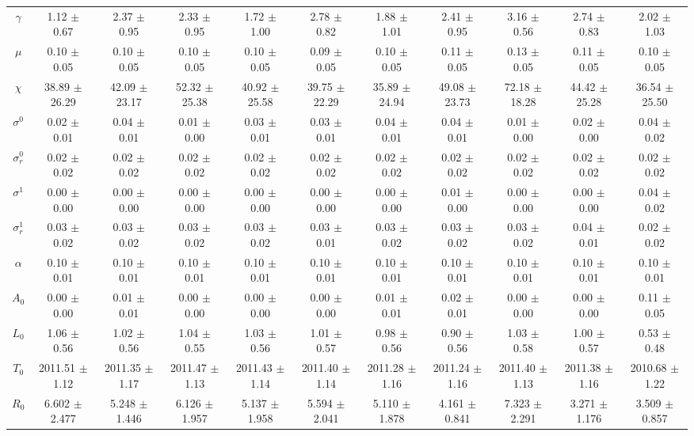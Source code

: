\begin{sidewaystable}
\begin{tabular}{ccccccccccc}
{\bf $\gamma$} & 1.12 $\pm$ 0.67 & 2.37 $\pm$ 0.95 & 2.33 $\pm$ 0.95 & 1.72 $\pm$ 1.00 & 2.78 $\pm$ 0.82 & 1.88 $\pm$ 1.01 & 2.41 $\pm$ 0.95 & 3.16 $\pm$ 0.56 & 2.74 $\pm$ 0.83 & 2.02 $\pm$ 1.03 \\
{\bf $\mu$} & 0.10 $\pm$ 0.05 & 0.10 $\pm$ 0.05 & 0.10 $\pm$ 0.05 & 0.10 $\pm$ 0.05 & 0.09 $\pm$ 0.05 & 0.10 $\pm$ 0.05 & 0.11 $\pm$ 0.05 & 0.13 $\pm$ 0.05 & 0.11 $\pm$ 0.05 & 0.10 $\pm$ 0.05 \\
{\bf $\chi$} & 38.89 $\pm$ 26.29 & 42.09 $\pm$ 23.17 & 52.32 $\pm$ 25.38 & 40.92 $\pm$ 25.58 & 39.75 $\pm$ 22.29 & 35.89 $\pm$ 24.94 & 49.08 $\pm$ 23.73 & 72.18 $\pm$ 18.28 & 44.42 $\pm$ 25.28 & 36.54 $\pm$ 25.50 \\
{\bf $\sigma^0$} & 0.02 $\pm$ 0.01 & 0.04 $\pm$ 0.01 & 0.01 $\pm$ 0.00 & 0.03 $\pm$ 0.01 & 0.03 $\pm$ 0.01 & 0.04 $\pm$ 0.01 & 0.04 $\pm$ 0.01 & 0.01 $\pm$ 0.00 & 0.02 $\pm$ 0.00 & 0.04 $\pm$ 0.02 \\
{\bf $\sigma^0_r$} & 0.02 $\pm$ 0.02 & 0.02 $\pm$ 0.02 & 0.02 $\pm$ 0.02 & 0.02 $\pm$ 0.02 & 0.02 $\pm$ 0.02 & 0.02 $\pm$ 0.02 & 0.02 $\pm$ 0.02 & 0.02 $\pm$ 0.02 & 0.02 $\pm$ 0.02 & 0.02 $\pm$ 0.02 \\
{\bf $\sigma^1$} & 0.00 $\pm$ 0.00 & 0.00 $\pm$ 0.00 & 0.00 $\pm$ 0.00 & 0.00 $\pm$ 0.00 & 0.00 $\pm$ 0.00 & 0.00 $\pm$ 0.00 & 0.01 $\pm$ 0.00 & 0.00 $\pm$ 0.00 & 0.00 $\pm$ 0.00 & 0.04 $\pm$ 0.02 \\
{\bf $\sigma^1_r$} & 0.03 $\pm$ 0.02 & 0.03 $\pm$ 0.02 & 0.03 $\pm$ 0.02 & 0.03 $\pm$ 0.02 & 0.03 $\pm$ 0.01 & 0.03 $\pm$ 0.02 & 0.03 $\pm$ 0.02 & 0.03 $\pm$ 0.02 & 0.04 $\pm$ 0.01 & 0.02 $\pm$ 0.02 \\
{\bf $\alpha$} & 0.10 $\pm$ 0.01 & 0.10 $\pm$ 0.01 & 0.10 $\pm$ 0.01 & 0.10 $\pm$ 0.01 & 0.10 $\pm$ 0.01 & 0.10 $\pm$ 0.01 & 0.10 $\pm$ 0.01 & 0.10 $\pm$ 0.01 & 0.10 $\pm$ 0.01 & 0.10 $\pm$ 0.01 \\
{\bf $A_0$} & 0.00 $\pm$ 0.00 & 0.01 $\pm$ 0.01 & 0.00 $\pm$ 0.00 & 0.00 $\pm$ 0.00 & 0.00 $\pm$ 0.00 & 0.01 $\pm$ 0.01 & 0.02 $\pm$ 0.01 & 0.00 $\pm$ 0.00 & 0.00 $\pm$ 0.00 & 0.11 $\pm$ 0.05 \\
{\bf $L_0$} & 1.06 $\pm$ 0.56 & 1.02 $\pm$ 0.56 & 1.04 $\pm$ 0.55 & 1.03 $\pm$ 0.56 & 1.01 $\pm$ 0.57 & 0.98 $\pm$ 0.56 & 0.90 $\pm$ 0.56 & 1.03 $\pm$ 0.58 & 1.00 $\pm$ 0.57 & 0.53 $\pm$ 0.48 \\
{\bf $T_0$} & 2011.51 $\pm$ 1.12 & 2011.35 $\pm$ 1.17 & 2011.47 $\pm$ 1.13 & 2011.43 $\pm$ 1.14 & 2011.40 $\pm$ 1.14 & 2011.28 $\pm$ 1.16 & 2011.24 $\pm$ 1.16 & 2011.40 $\pm$ 1.13 & 2011.38 $\pm$ 1.16 & 2010.68 $\pm$ 1.22 \\
{\bf $R_0$} & 6.602 $\pm$ 2.477& 5.248 $\pm$ 1.446& 6.126 $\pm$ 1.957& 5.137 $\pm$ 1.958& 5.594 $\pm$ 2.041& 5.110 $\pm$ 1.878& 4.161 $\pm$ 0.841& 7.323 $\pm$ 2.291& 3.271 $\pm$ 1.176& 3.509 $\pm$ 0.857\\
\hline\hline
\end{tabular}
\label{Table:Parameter_Values}
\end{sidewaystable}
